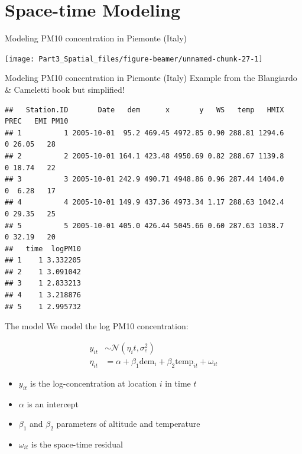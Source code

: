 \documentclass[
  ignorenonframetext,
]{beamer}
\begin{document}
\hypertarget{space-time-modeling}{%
\section{Space-time Modeling}\label{space-time-modeling}}

\begin{frame}{Modeling PM10 concentration in Piemonte (Italy)}
\protect\hypertarget{modeling-pm10-concentration-in-piemonte-italy}{}
\begin{center}\texttt{[image: Part3\_Spatial\_files/figure-beamer/unnamed-chunk-27-1]} \end{center}
\end{frame}

\begin{frame}[fragile]{Modeling PM10 concentration in Piemonte (Italy)}
\protect\hypertarget{modeling-pm10-concentration-in-piemonte-italy-1}{}
Example from the Blangiardo \& Cameletti book but simplified! \tiny

\begin{verbatim}
##   Station.ID       Date   dem      x       y   WS   temp   HMIX PREC   EMI PM10
## 1          1 2005-10-01  95.2 469.45 4972.85 0.90 288.81 1294.6    0 26.05   28
## 2          2 2005-10-01 164.1 423.48 4950.69 0.82 288.67 1139.8    0 18.74   22
## 3          3 2005-10-01 242.9 490.71 4948.86 0.96 287.44 1404.0    0  6.28   17
## 4          4 2005-10-01 149.9 437.36 4973.34 1.17 288.63 1042.4    0 29.35   25
## 5          5 2005-10-01 405.0 426.44 5045.66 0.60 287.63 1038.7    0 32.19   20
##   time  logPM10
## 1    1 3.332205
## 2    1 3.091042
## 3    1 2.833213
## 4    1 3.218876
## 5    1 2.995732
\end{verbatim}

\normalsize
\end{frame}

\begin{frame}{The model}
\protect\hypertarget{the-model-1}{}
We model the log PM10 concentration:

\[
\begin{aligned}
y_{it}&\sim\mathcal{N}(\eta_it, \sigma^2_e)\\
\eta_{it}& = \alpha + \beta_1\text{dem}_i + \beta_2\text{temp}_{it} + \omega_{it}
\end{aligned}
\]

\begin{itemize}
\item
  \(y_{it}\) is the log-concentration at location \(i\) in time \(t\)
\item
  \(\alpha\) is an intercept
\item
  \(\beta_1\) and \(\beta_2\) parameters of altitude and temperature
\item
  \(\omega_{it}\) is the space-time residual
\end{itemize}
\end{frame}
\end{document}
